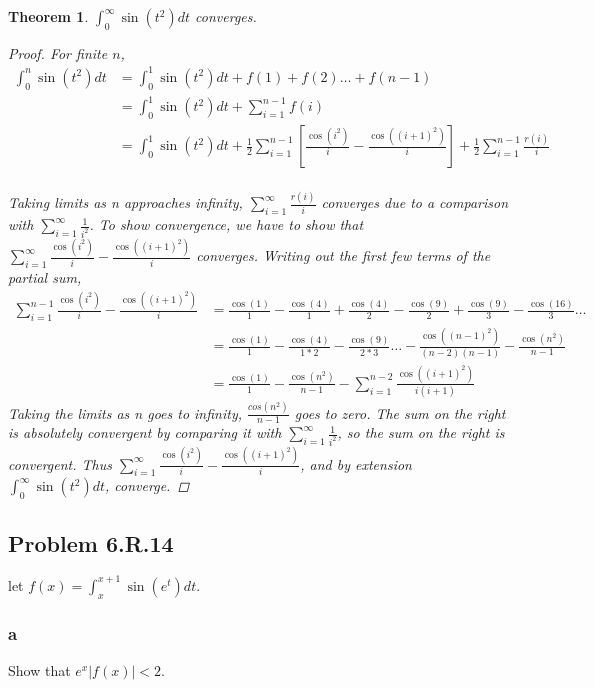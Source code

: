 \documentclass{amsart}
\newtheorem{theorem}{Theorem}
\begin{document}
\begin{theorem}
$\int_0^\infty \sin(t^2)dt$ converges.

\begin{proof}
For finite $n$,
\begin{align*}
\int_0^n \sin(t^2)dt &= \int_0^1 \sin(t^2)dt + f(1) + f(2) \dots + f(n-1) \\
&= \int_0^1 \sin(t^2)dt + \sum_{i=1}^{n-1}f(i) \\
&= \int_0^1 \sin(t^2)dt + \frac{1}{2}\sum_{i=1}^{n-1}\left[
\frac{\cos(i^2)}{i} - \frac{\cos\left((i+1)^2\right)}{i} \right]
+ \frac{1}{2}\sum_{i=1}^{n-1} \frac{r(i)}{i}
 \\
\end{align*}

Taking limits as n approaches infinity, $\sum_{i=1}^\infty \frac{r(i)}{i}$ converges due to a comparison with $\sum_{i=1}^\infty \frac{1}{i^2}$. To show convergence, we have to show that $\sum_{i=1}^{\infty}\frac{\cos(i^2)}{i} - \frac{\cos\left((i+1)^2\right)}{i}$ converges. Writing out the first few terms of the partial sum,
\begin{align*}
\sum_{i=1}^{n-1} \frac{\cos(i^2)}{i} - \frac{\cos\left((i+1)^2\right)}{i}
&= \frac{\cos(1)}{1} - \frac{\cos(4)}{1} + \frac{\cos(4)}{2} - \frac{\cos(9)}{2} + \frac{\cos(9)}{3} - \frac{\cos(16)}{3} \dots \\
&= \frac{\cos(1)}{1} - \frac{\cos(4)}{1*2} - \frac{\cos(9)}{2*3} \dots
- \frac{\cos\left((n-1)^2\right)}{(n-2)(n-1)} - \frac{\cos(n^2)}{n-1} \\
&= \frac{\cos(1)}{1} - \frac{\cos(n^2)}{n-1} 
- \sum_{i=1}^{n-2} \frac{\cos\left((i+1)^2\right)}{i(i+1)}
\end{align*}
Taking the limits as n goes to infinity, $\frac{cos(n^2)}{n-1}$ goes to zero. The sum on the right is absolutely convergent by comparing it with $\sum_{i=1}^\infty \frac{1}{i^2}$, so the sum on the right is convergent. Thus $\sum_{i=1}^{\infty}\frac{\cos(i^2)}{i} - \frac{\cos\left((i+1)^2\right)}{i}$, and by extension $\int_0^\infty \sin(t^2)dt$, converge.
\end{proof}
\end{theorem}

\subsection*{Problem 6.R.14}

let $f(x) = \int_x^{x+1}\sin(e^t)dt$.

\subsubsection*{a}
Show that $e^x|f(x)| < 2$.
\end{document}
